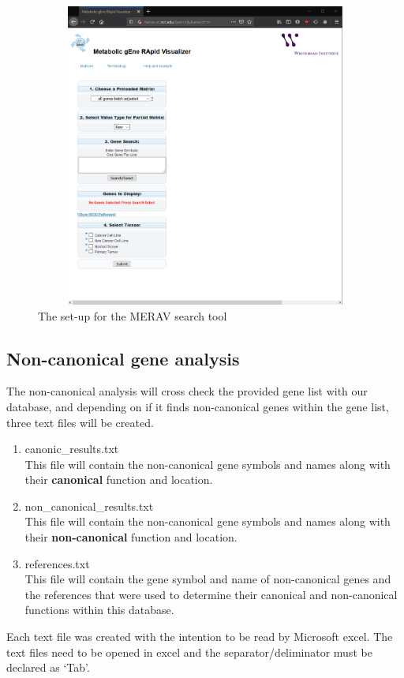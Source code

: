 \documentclass[11pt]{article}
\begin{document}
\begin{figure}[h!]
\centering
\includegraphics[width=15cm,height=10cm,keepaspectratio]{MERAV.png}
\caption{The set-up for the MERAV search tool}
\label{fig:merav}
\end{figure}

\subsection{Non-canonical gene analysis}
The non-canonical analysis will cross check the provided gene list with our database, and depending on if it finds non-canonical genes within the gene list, three text files will be created.
\begin{enumerate}
\item canonic\_results.txt\\
This file will contain the non-canonical gene symbols and names along with their \textbf{canonical} function and location.
\item non\_canonical\_results.txt\\
This file will contain the non-canonical gene symbols and names along with their \textbf{non-canonical} function and location.
\item references.txt\\
This file will contain the gene symbol and name of non-canonical genes and the references that were used to determine their canonical and non-canonical functions within this database.
\end{enumerate}
Each text file was created with the intention to be read by Microsoft excel. The text files need to be opened in excel and the separator/deliminator must be declared as `Tab'.
\newpage
\end{document}
